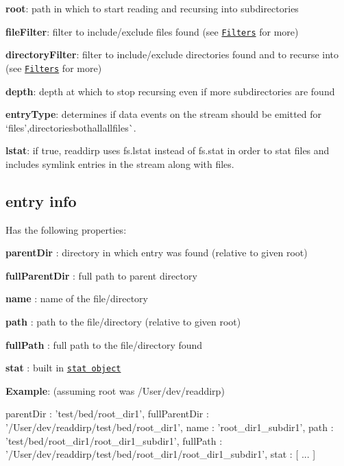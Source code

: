 \begin{DoxyItemize}
\item {\bfseries root}\+: path in which to start reading and recursing into subdirectories
\item {\bfseries file\+Filter}\+: filter to include/exclude files found (see \href{#filters}{\tt Filters} for more)
\item {\bfseries directory\+Filter}\+: filter to include/exclude directories found and to recurse into (see \href{#filters}{\tt Filters} for more)
\item {\bfseries depth}\+: depth at which to stop recursing even if more subdirectories are found
\item {\bfseries entry\+Type}\+: determines if data events on the stream should be emitted for `\textquotesingle{}files'{\ttfamily ,}\textquotesingle{}directories\textquotesingle{}{\ttfamily ,}\textquotesingle{}both\textquotesingle{}all\textquotesingle{}all\textquotesingle{}files\textquotesingle{}\`{}.
\item {\bfseries lstat}\+: if {\ttfamily true}, readdirp uses {\ttfamily fs.\+lstat} instead of {\ttfamily fs.\+stat} in order to stat files and includes symlink entries in the stream along with files.
\end{DoxyItemize}

\subsection*{entry info}

Has the following properties\+:


\begin{DoxyItemize}
\item {\bfseries parent\+Dir} \+: directory in which entry was found (relative to given root)
\item {\bfseries full\+Parent\+Dir} \+: full path to parent directory
\item {\bfseries name} \+: name of the file/directory
\item {\bfseries path} \+: path to the file/directory (relative to given root)
\item {\bfseries full\+Path} \+: full path to the file/directory found
\item {\bfseries stat} \+: built in \href{http://nodejs.org/docs/v0.4.9/api/fs.html#fs.Stats}{\tt stat object}
\item {\bfseries Example}\+: (assuming root was {\ttfamily /\+User/dev/readdirp}) \begin{DoxyVerb}  parentDir     :  'test/bed/root_dir1',
  fullParentDir :  '/User/dev/readdirp/test/bed/root_dir1',
  name          :  'root_dir1_subdir1',
  path          :  'test/bed/root_dir1/root_dir1_subdir1',
  fullPath      :  '/User/dev/readdirp/test/bed/root_dir1/root_dir1_subdir1',
  stat          :  [ ... ]
\end{DoxyVerb}

\end{DoxyItemize}

